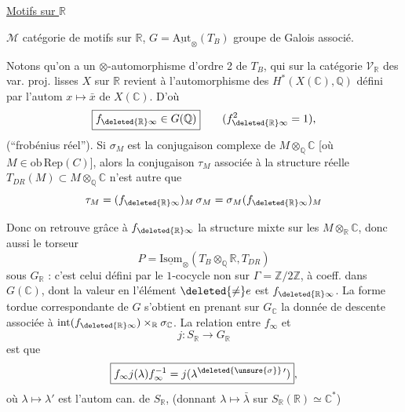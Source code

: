 \uline{Motifs sur $\mathbb R$}

$\mathcal M$ \inserted{$\otimes$-}catégorie de motifs sur $\mathbb R$, $G=\underline{\mathrm{Aut}}_\otimes(T_B)$ groupe de Galois associé.

Notons qu'on a un $\otimes$-automorphisme d'ordre 2 de $T_B$,
qui sur la catégorie $\mathcal V_{\mathbb R}$ des var. proj. lisses $X$ sur $\mathbb R$
revient à l'automorphisme des $H^*(X(\mathbb C),\mathbb Q)$ défini par
l'autom $x\mapsto\bar x$ de $X(\mathbb C)$. D'où
\[
\boxed{f_{\deleted{\mathbb R}\infty}\in G(\mathbb Q)}\qquad(f_{\deleted{\mathbb R}\infty}^{2}=1),
\]
(``frobénius réel'').  Si $\sigma_M$ est la conjugaison
complexe de $M\otimes_{\mathbb Q}\mathbb C$ [où $M\in\mathrm{ob}\,\mathrm{Rep}(C)$], alors
la conjugaison $\tau_M$ associée à la structure réelle
$T_{DR}(M)\subset M\otimes_{\mathbb Q}\mathbb C$ n'est autre que
\[
\tau_M=(f_{\deleted{\mathbb R}\infty})_M\,\sigma_M
=\sigma_M(f_{\deleted{\mathbb R}\infty})_M
\]

Donc on retrouve grâce à $f_{\deleted{\mathbb R}\infty}$ la structure mixte sur
les $M\otimes_{\mathbb R}\mathbb C$, donc aussi le torseur
\[
P=\underline{\mathrm{Isom}}_\otimes(T_B\otimes_{\mathbb Q}\mathbb R,T_{DR})
\]
sous $G_{\mathbb R}$ : c'est celui défini par le $1$-cocycle  non 
sur $\Gamma=\mathbb Z/2\mathbb Z$, à coeff.  dans $G(\mathbb C)$, dont la valeur en
l'élément $\deleted{\ne}e$ est $f_{\deleted{\mathbb R}\infty}$. La forme tordue correspondante
de $G$ s'obtient en prenant sur $G_{\mathbb C}$ la donnée
de descente associée à  $\mathrm{int}(f_{\deleted{\mathbb R}\infty})\times_{\mathbb R}\sigma_{\mathbb C}$.  La relation entre $f_\infty$ et
\[
j:S_{\mathbb R}\longrightarrow G_{\mathbb R}
\]
est que
\[
\boxed{f_\infty j(\lambda) f_\infty^{-1}=j(\lambda^{\deleted{\unsure{\sigma}}\,\prime})},
\]
où $\lambda\mapsto\lambda'$ est l'autom can. de $S_{\mathbb R}$,
(donnant $\lambda\mapsto\bar\lambda$ sur $S_{\mathbb R}(\mathbb R)\simeq\mathbb C^*$)
